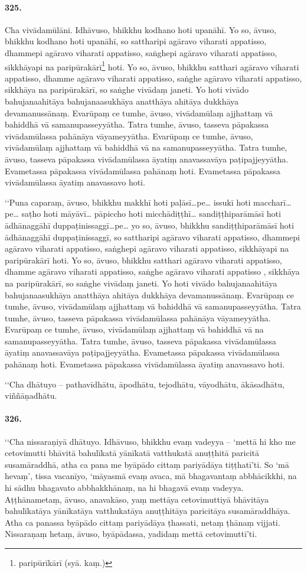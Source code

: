 \paragraph{325.} Cha vivādamūlāni. Idhāvuso, bhikkhu kodhano hoti upanāhī. Yo so, āvuso, bhikkhu kodhano hoti upanāhī, so sattharipi agāravo viharati appatisso, dhammepi agāravo viharati appatisso, saṅghepi agāravo viharati appatisso, sikkhāyapi na paripūrakārī\footnote{paripūrīkārī (syā. kaṃ.)} hoti. Yo so, āvuso, bhikkhu satthari agāravo viharati appatisso, dhamme agāravo viharati appatisso, saṅghe agāravo viharati appatisso, sikkhāya na paripūrakārī, so saṅghe vivādaṃ janeti. Yo hoti vivādo bahujanaahitāya bahujanaasukhāya anatthāya ahitāya dukkhāya devamanussānaṃ. Evarūpaṃ ce tumhe, āvuso, vivādamūlaṃ ajjhattaṃ vā bahiddhā vā samanupasseyyātha. Tatra tumhe, āvuso, tasseva pāpakassa vivādamūlassa pahānāya vāyameyyātha. Evarūpaṃ ce tumhe, āvuso, vivādamūlaṃ ajjhattaṃ vā bahiddhā vā na samanupasseyyātha. Tatra tumhe, āvuso, tasseva pāpakassa vivādamūlassa āyatiṃ anavassavāya paṭipajjeyyātha. Evametassa pāpakassa vivādamūlassa pahānaṃ hoti. Evametassa pāpakassa vivādamūlassa āyatiṃ anavassavo hoti.

‘‘Puna caparaṃ, āvuso, bhikkhu makkhī hoti paḷāsī…pe… issukī hoti maccharī…pe… saṭho hoti māyāvī… pāpiccho hoti micchādiṭṭhī… sandiṭṭhiparāmāsī hoti ādhānaggāhī duppaṭinissaggī…pe… yo so, āvuso, bhikkhu sandiṭṭhiparāmāsī hoti ādhānaggāhī duppaṭinissaggī, so sattharipi agāravo viharati appatisso, dhammepi agāravo viharati appatisso, saṅghepi agāravo viharati appatisso, sikkhāyapi na paripūrakārī hoti. Yo so, āvuso, bhikkhu satthari agāravo viharati appatisso, dhamme agāravo viharati appatisso, saṅghe agāravo viharati appatisso , sikkhāya na paripūrakārī, so saṅghe vivādaṃ janeti. Yo hoti vivādo bahujanaahitāya bahujanaasukhāya anatthāya ahitāya dukkhāya devamanussānaṃ. Evarūpaṃ ce tumhe, āvuso, vivādamūlaṃ ajjhattaṃ vā bahiddhā vā samanupasseyyātha. Tatra tumhe, āvuso, tasseva pāpakassa vivādamūlassa pahānāya vāyameyyātha. Evarūpaṃ ce tumhe, āvuso, vivādamūlaṃ ajjhattaṃ vā bahiddhā vā na samanupasseyyātha. Tatra tumhe, āvuso, tasseva pāpakassa vivādamūlassa āyatiṃ anavassavāya paṭipajjeyyātha. Evametassa pāpakassa vivādamūlassa pahānaṃ hoti. Evametassa pāpakassa vivādamūlassa āyatiṃ anavassavo hoti.

‘‘Cha dhātuyo – pathavīdhātu, āpodhātu, tejodhātu, vāyodhātu, ākāsadhātu, viññāṇadhātu.

\paragraph{326.} ‘‘Cha nissaraṇiyā dhātuyo. Idhāvuso, bhikkhu evaṃ vadeyya – ‘mettā hi kho me cetovimutti bhāvitā bahulīkatā yānīkatā vatthukatā anuṭṭhitā paricitā susamāraddhā, atha ca pana me byāpādo cittaṃ pariyādāya tiṭṭhatī’ti. So ‘mā hevaṃ’, tissa vacanīyo, ‘māyasmā evaṃ avaca, mā bhagavantaṃ abbhācikkhi, na hi sādhu bhagavato abbhakkhānaṃ, na hi bhagavā evaṃ vadeyya. Aṭṭhānametaṃ, āvuso, anavakāso, yaṃ mettāya cetovimuttiyā bhāvitāya bahulīkatāya yānīkatāya vatthukatāya anuṭṭhitāya paricitāya susamāraddhāya. Atha ca panassa byāpādo cittaṃ pariyādāya ṭhassati, netaṃ ṭhānaṃ vijjati. Nissaraṇaṃ hetaṃ, āvuso, byāpādassa, yadidaṃ mettā cetovimuttī’ti.

